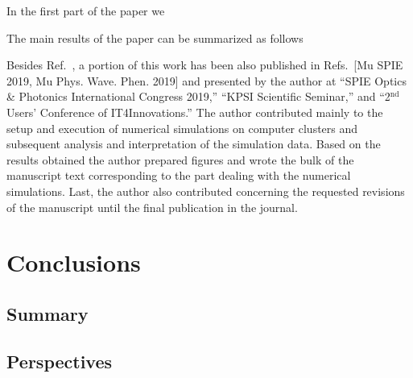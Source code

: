 \documentclass[10pt, twoside, a4paper, openright]{report}
\newcommand{\q}[1]{``#1''} %
\newcommand{\klimo}{doc. Ing. Ondřej Klimo, Ph.D.}
\newcommand{\bulanov}{prof. Sergei Vladimirovich Bulanov}
\begin{document}
In the first part of the paper we 

The main results of the paper can be summarized as follows

Besides Ref.~, a portion of this work has been also published in Refs.~[Mu SPIE 2019, Mu Phys. Wave. Phen. 2019] and presented by the author at \q{SPIE Optics \& Photonics International Congress 2019,} \q{KPSI Scientific Seminar,} and \q{2$ ^{\mathrm{nd}} $ Users' Conference of IT4Innovations.} The author contributed mainly to the setup and execution of numerical simulations on computer clusters and subsequent analysis and interpretation of the simulation data. Based on the results obtained the author prepared figures and wrote the bulk of the manuscript text corresponding to the part dealing with the numerical simulations. Last, the author also contributed concerning the requested revisions of the manuscript until the final publication in the journal.






\chapter{Conclusions}
%

\section{Summary}

\section{Perspectives}



\end{document}
